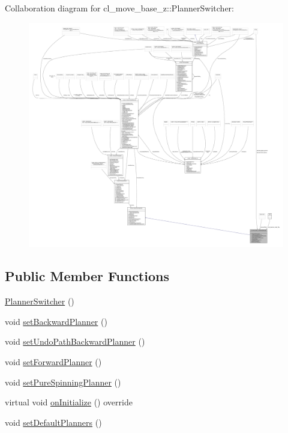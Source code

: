 Collaboration diagram for cl\+\_\+move\+\_\+base\+\_\+z\+:\+:Planner\+Switcher\+:
\nopagebreak
\begin{figure}[H]
\begin{center}
\leavevmode
\includegraphics[width=350pt]{classcl__move__base__z_1_1PlannerSwitcher__coll__graph}
\end{center}
\end{figure}
\subsection*{Public Member Functions}
\begin{DoxyCompactItemize}
\item 
\hyperlink{classcl__move__base__z_1_1PlannerSwitcher_aacdf8266ba7dc861efd460645587561f}{Planner\+Switcher} ()
\item 
void \hyperlink{classcl__move__base__z_1_1PlannerSwitcher_a6995deff44418a0965e4e793de8c4857}{set\+Backward\+Planner} ()
\item 
void \hyperlink{classcl__move__base__z_1_1PlannerSwitcher_a22df6956c30a8e0ab4b942742cc8dafd}{set\+Undo\+Path\+Backward\+Planner} ()
\item 
void \hyperlink{classcl__move__base__z_1_1PlannerSwitcher_a4bec9859c90f125f9fcc2b68594caf17}{set\+Forward\+Planner} ()
\item 
void \hyperlink{classcl__move__base__z_1_1PlannerSwitcher_a0accdff89d7858658c1835f06b53786f}{set\+Pure\+Spinning\+Planner} ()
\item 
virtual void \hyperlink{classcl__move__base__z_1_1PlannerSwitcher_a36bc2b9788f03a1ca02b954c625ef4c5}{on\+Initialize} () override
\item 
void \hyperlink{classcl__move__base__z_1_1PlannerSwitcher_ad3f0d08a51af6218d203bf44a7f9df40}{set\+Default\+Planners} ()
\end{DoxyCompactItemize}
